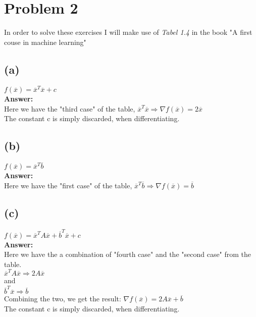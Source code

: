 \section{Problem 2}
In order to solve these exercises I will make use of \emph{Tabel 1.4} in the book "A first couse in machine learning"
\subsection{(a)}
$f(\overline{x})=\overline{x}^{T}\overline{x}+c$
\\
\textbf{Answer:}
\\
Here we have the "third case" of the table, 
$\overline{x}^{T}\overline{x} \Rightarrow \nabla f(\overline{x}) = 2\overline{x}$\\
The constant c is simply discarded, when differentiating.
\subsection{(b)}
$f(\overline{x})=\overline{x}^{T}\overline{b}$
\\
\textbf{Answer:}
\\
Here we have the "first case" of the table, 
$\overline{x}^{T}\overline{b} \Rightarrow \nabla f(\overline{x}) = \overline{b}$


\subsection{(c)}
$f(\overline{x})=\overline{x}^{T}A\overline{x}+\overline{b}^{T}\overline{x}+c$
\\
\textbf{Answer:}
\\
Here we have the a combination of "fourth case" and the "second case" from the table.
\\
$\overline{x}^{T}A\overline{x} \Rightarrow 2A\overline{x} $\\
and\\
$\overline{b}^{T}\overline{x} \Rightarrow \overline{b} $\\
Combining the two, we get the result: $\nabla f(\overline{x}) = 2A\overline{x} + \overline{b}$\\
The constant c is simply discarded, when differentiating.


